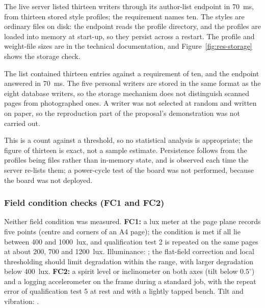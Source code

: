 
            The live server listed thirteen writers through its author-list endpoint in 70~ms, from thirteen stored style profiles; the requirement names ten.
            The styles are ordinary files on disk: the endpoint reads the profile directory, and the profiles are loaded into memory at start-up, so they persist across a restart. The profile and weight-file sizes are in the technical documentation, and Figure~\ref{fig:res-storage} shows the storage check.



            The list contained thirteen entries against a requirement of ten, and the endpoint answered in 70~ms.
            The five personal writers are stored in the same format as the eight database writers, so the storage mechanism does not distinguish scanned pages from photographed ones.
            A writer was not selected at random and written on paper, so the reproduction part of the proposal's demonstration was not carried out.


            This is a count against a threshold, so no statistical analysis is appropriate; the figure of thirteen is exact, not a sample estimate.
            Persistence follows from the profiles being files rather than in-memory state, and is observed each time the server re-lists them; a power-cycle test of the board was not performed, because the board was not deployed.


\subsubsection*{Field condition checks (FC1 and FC2)}
\label{sec:res-fc}

Neither field condition was measured.
\textbf{FC1:} a lux meter at the page plane records five points (centre and corners of an A4 page); the condition is met if all lie between 400 and 1000~lux, and qualification test 2 is repeated on the same pages at about 200, 700 and 1200~lux.
Illuminance: \nym{}; the flat-field correction and local thresholding should limit degradation within the range, with larger degradation below 400~lux.
\textbf{FC2:} a spirit level or inclinometer on both axes (tilt below $0.5^\circ$) and a logging accelerometer on the frame during a standard job, with the repeat error of qualification test 5 at rest and with a lightly tapped bench.
Tilt and vibration: \nym{}.
